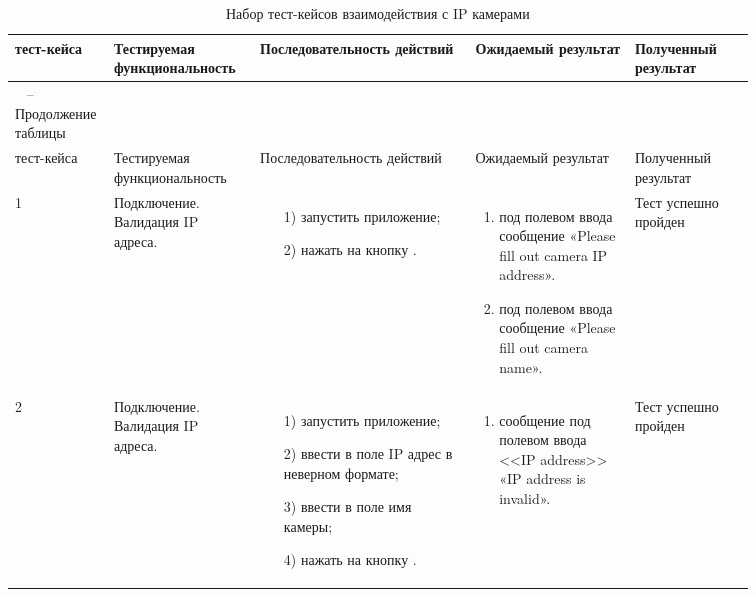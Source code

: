 \begin{longtable}{| >{\raggedright}m{0.06\linewidth} 
                  | >{\raggedright}m{0.18\linewidth} 
                  | >{\raggedright}m{0.27\linewidth} 
                  | >{\raggedright}m{0.2\linewidth} 
                  | >{\raggedright\arraybackslash}m{0.15\linewidth}|}
   \caption{Набор тест-кейсов взаимодействия с IP камерами} \label{table:testing:ip_cameras} \\

   \hline
   \No{} тест-кейса & Тестируемая функциональность & Последовательность действий & Ожидаемый результат & Полученный результат\\
   \endfirsthead

	\multicolumn{3}{c}%
	{{ \raggedleft \tablename\ \thetable{} -- Продолжение таблицы}} \\

	\hline
   	\No{} тест-кейса & Тестируемая функциональность & Последовательность действий & Ожидаемый результат & Полученный результат\\

	\hline 
	\endhead

	\hline
	1 & Подключение. Валидация IP адреса. &
   			\begin{enumerate}
				\item[1)] запустить приложение;
				\item[2)] нажать на кнопку \connectButton{}.
			\end{enumerate}
   			& 
   			\begin{enumerate}
   				\item под полевом ввода \ipInput{} сообщение «Please fill out camera IP address».
   				\item под полевом ввода \nameInput{} сообщение «Please fill out camera name».
   			\end{enumerate}
   			& Тест успешно пройден \\
	\hline
	2 & Подключение. Валидация IP адреса. & 
   			\begin{enumerate}
				\item[1)] запустить приложение;
				\item[2)] ввести в поле \nameInput{} IP адрес в неверном формате;
				\item[3)] ввести в поле \ipInput{} имя камеры;
				\item[4)] нажать на кнопку \connectButton{}.
			\end{enumerate}
   			& 
   			\begin{enumerate}
   				\item сообщение под полевом ввода <<IP address>> «IP address is invalid».
   			\end{enumerate}
   			& Тест успешно пройден \\ 


\end{longtable}
